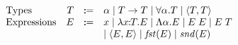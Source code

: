 \[
\begin{array}{lrrl}
  \text{Types} & T & \dcoloneq &
    \alpha
    \mid T \to T
    \mid \univquant{\alpha}{T}
    \mid \langle T, T \rangle \\

  \text{Expressions} & E & \dcoloneq &
    x
    \mid \abs{\rel{x}{T}}{E}
    \mid \Abs{\alpha}{E}
    \mid \app{E}{E}
    \mid \app{E}{T} \\ & & &
    \mid \langle E, E \rangle
    \mid \meta{fst} E
    \mid \meta{snd} E
\end{array}
\]
